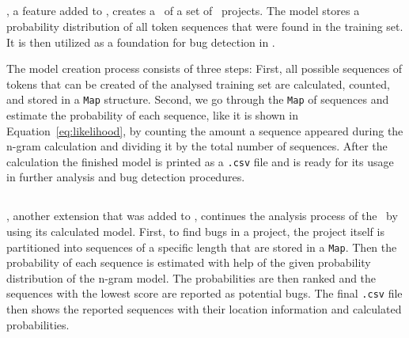 \subsection{\ngramtrainer{}}\label{subsec:ngramtrainer}
\ngramtrainer, a feature added to \litterbox, creates a \ngram\ of a set of \scratch\ projects. The model stores a probability distribution of all token sequences that were found in the training set. It is then utilized as a foundation for bug detection in \scratch.

The model creation process consists of three steps: First, all possible sequences of tokens that can be created of the analysed training set are calculated, counted, and stored in a \texttt{Map} structure. Second, we go through the \texttt{Map} of sequences and estimate the probability of each sequence, like it is shown in Equation~\ref{eq:likelihood}, by counting the amount a sequence appeared during the n-gram calculation and dividing it by the total number of sequences. After the calculation the finished model is printed as a \texttt{.csv} file and is ready for its usage in further analysis and bug detection procedures.

\subsection{\ngrambugfinder{}}\label{subsec:ngrambugfinder}
\ngrambugfinder, another extension that was added to \litterbox, continues the analysis process of the \ngramtrainer\ by using its calculated model. First, to find bugs in a project, the project itself is partitioned into sequences of a specific length that are stored in a \texttt{Map}. Then the probability of each sequence is estimated with help of the given probability distribution of the n-gram model. The probabilities are then ranked and the sequences with the lowest score are reported as potential bugs. The final \texttt{.csv} file then shows the reported sequences with their location information and calculated probabilities.